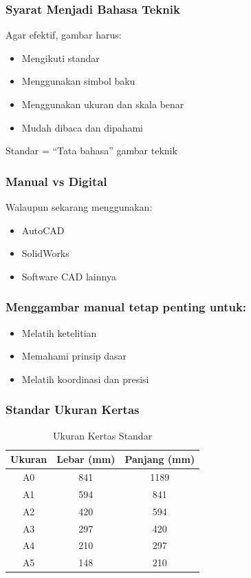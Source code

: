 \documentclass[../gbr_teknik.tex]{subfiles}
\begin{document}
\begin{frame}[t,mycolor=digiPH_red,mytitle=standard,dark]
	\frametitle{Syarat Menjadi Bahasa Teknik}
	Agar efektif, gambar harus:
	\begin{itemize}
		\item Mengikuti standar
		\item Menggunakan simbol baku
		\item Menggunakan ukuran dan skala benar
		\item Mudah dibaca dan dipahami
	\end{itemize}

	\noindent Standar = ``Tata bahasa'' gambar teknik

\end{frame}

\begin{frame}[t,mycolor=digiPH_ocean,mytitle=center,dark]

	\frametitle{Manual vs Digital}
	Walaupun sekarang menggunakan:
	\begin{itemize}
		\item AutoCAD
		\item SolidWorks
		\item Software CAD lainnya
	\end{itemize}

\end{frame}

\begin{frame}[t,mycolor=digiPH_red,mytitle=standard,dark]
	\frametitle{Menggambar manual tetap penting untuk:}
	\begin{itemize}
		\item Melatih ketelitian
		\item Memahami prinsip dasar
		\item Melatih koordinasi dan presisi
	\end{itemize}


\end{frame}

\begin{frame}[t,mycolor=digiPH_leaf,mytitle=standard,dark]
	\frametitle{Standar Ukuran Kertas}
	\begin{table}[h]
		\centering
		\caption{Ukuran Kertas Standar}
		\begin{tabular}{|c|c|c|}
			\hline
			Ukuran & Lebar (mm) & Panjang (mm) \\
			\hline
			A0     & 841        & 1189         \\
			A1     & 594        & 841          \\
			A2     & 420        & 594          \\
			A3     & 297        & 420          \\
			A4     & 210        & 297          \\
			A5     & 148        & 210          \\
			\hline
		\end{tabular}
	\end{table}


\end{frame}
\end{document}
